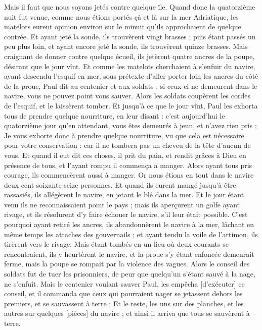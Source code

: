 \begin{multicols}{2}
Mais il faut que nous soyons jetés contre quelque île.
Quand donc la quatorzième nuit fut venue, comme nous étions portés çà et là sur la mer Adriatique, les matelots eurent opinion environ sur le minuit qu'ils approchaient de quelque contrée.
Et ayant jeté la sonde, ils trouvèrent vingt brasses ; puis étant passés un peu plus loin, et ayant encore jeté la sonde, ils trouvèrent quinze brasses.
Mais craignant de donner contre quelque écueil, ils jetèrent quatre ancres de la poupe, désirant que le jour vînt.
Et comme les matelots cherchaient à s'enfuir du navire, ayant descendu l'esquif en mer, sous prétexte d'aller porter loin les ancres du côté de la proue,
Paul dit au centenier et aux soldats : si ceux-ci ne demeurent dans le navire, vous ne pouvez point vous sauver.
Alors les soldats coupèrent les cordes de l'esquif, et le laissèrent tomber.
Et jusqu'à ce que le jour vînt, Paul les exhorta tous de prendre quelque nourriture, en leur disant : c'est aujourd'hui le quatorzième jour qu'en attendant, vous êtes demeurés à jeun, et n'avez rien pris ;
Je vous exhorte donc à prendre quelque nourriture, vu que cela est nécessaire pour votre conservation : car il ne tombera pas un cheveu de la tête d'aucun de vous.
Et quand il eut dit ces choses, il prit du pain, et rendit grâces à Dieu en présence de tous, et l'ayant rompu il commença a manger.
Alors ayant tous pris courage, ils commencèrent aussi à manger.
Or nous étions en tout dans le navire deux cent soixante-seize personnes.
Et quand ils eurent mangé jusqu'à être rassasiés, ils allégèrent le navire, en jetant le blé dans la mer.
Et le jour étant venu ils ne reconnaissaient point le pays ; mais ils aperçurent un golfe ayant rivage, et ils résolurent d'y faire échouer le navire, s'il leur était possible.
C'est pourquoi ayant retiré les ancres, ils abandonnèrent le navire à la mer, lâchant en même temps les attaches des gouvernails ; et ayant tendu la voile de l'artimon, ils tirèrent vers le rivage.
Mais étant tombés en un lieu où deux courants se rencontraient, ils y heurtèrent le navire, et la proue s'y étant enfoncée demeurait ferme, mais la poupe se rompait par la violence des vagues.
Alors le conseil des soldats fut de tuer les prisonniers, de peur que quelqu'un s'étant sauvé à la nage, ne s'enfuît.
Mais le centenier voulant sauver Paul, les empêcha [d'exécuter] ce conseil, et il commanda que ceux qui pourraient nager se jetassent dehors les premiers, et se sauvassent à terre ;
Et le reste, les uns sur des planches, et les autres sur quelques [pièces] du navire ; et ainsi il arriva que tous se sauvèrent à terre.

\end{multicols}
